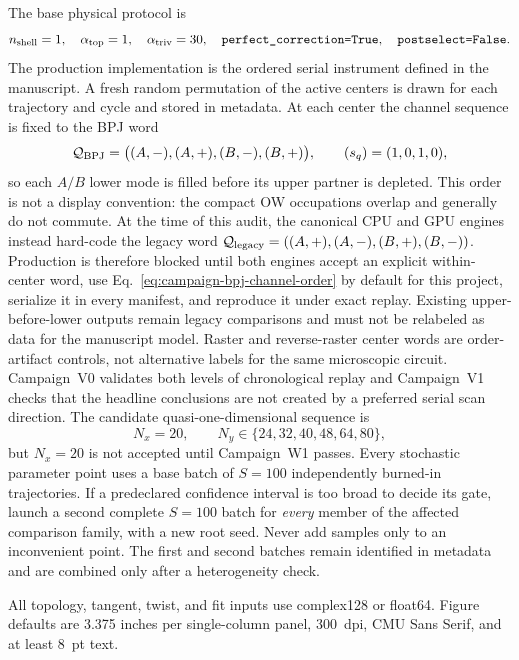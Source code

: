 \documentclass[aps,prx,onecolumn,nofootinbib,superscriptaddress,longbibliography]{revtex4-2}
\newcommand{\code}[1]{\texttt{#1}}
\begin{document}
The base physical protocol is
\begin{equation}
 n_{\rm shell}=1,\quad \alpha_{\rm top}=1,\quad \alpha_{\rm triv}=30,
 \quad \code{perfect\_correction=True},\quad \code{postselect=False}.
\end{equation}
The production implementation is the ordered serial instrument defined in the manuscript.
A fresh random permutation of the active centers is drawn for each trajectory and cycle and
stored in metadata.  At each center the channel sequence is fixed to the BPJ word
\begin{equation}
 \mathcal Q_{\rm BPJ}=\bigl((A,-),(A,+),(B,-),(B,+)\bigr),
 \qquad (s_q)=(1,0,1,0),
 \label{eq:campaign-bpj-channel-order}
\end{equation}
so each \(A/B\) lower mode is filled before its upper partner is depleted.  This order is
not a display convention: the compact OW occupations overlap and generally do not commute.
At the time of this audit, the canonical CPU and GPU engines instead hard-code the legacy
word \(\mathcal Q_{\rm legacy}=((A,+),(A,-),(B,+),(B,-))\).  Production is therefore
blocked until both engines accept an explicit within-center word, use
Eq.~\eqref{eq:campaign-bpj-channel-order} by default for this project, serialize it in every
manifest, and reproduce it under exact replay.  Existing upper-before-lower outputs remain
legacy comparisons and must not be relabeled as data for the manuscript model.  Raster and
reverse-raster center words are order-artifact controls, not alternative labels for the same
microscopic circuit.  Campaign~V0 validates both levels of chronological replay and
Campaign~V1 checks that the headline conclusions are not created by a preferred serial scan
direction.  The candidate
quasi-one-dimensional sequence is
\begin{equation}
 N_x=20,\qquad N_y\in\{24,32,40,48,64,80\},
 \label{eq:primary-sizes}
\end{equation}
but $N_x=20$ is not accepted until Campaign~W1 passes.  Every stochastic parameter point
uses a base batch of $S=100$ independently burned-in trajectories.  If a predeclared
confidence interval is too broad to decide its gate, launch a second complete $S=100$
batch for \emph{every} member of the affected comparison family, with a new root seed.
Never add samples only to an inconvenient point.  The first and second batches remain
identified in metadata and are combined only after a heterogeneity check.

All topology, tangent, twist, and fit inputs use complex128 or float64.  Figure defaults are
3.375 inches per single-column panel, 300~dpi, CMU Sans Serif, and at least 8~pt text.
\end{document}
